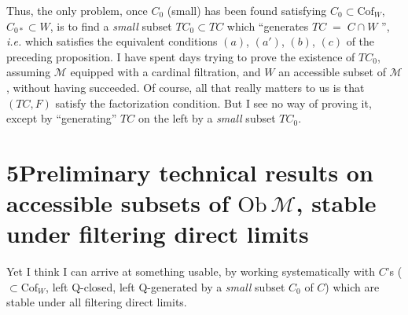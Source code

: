 \documentclass[11pt]{article}
\newcommand{\msp}[1]{\marginpar{\footnotesize [#1]}}
\newcommand{\Cof}{\mathrm{Cof}}
\begin{document}
\msp{page 43}
Thus, the only problem, once $C_0$ (small) has been found satisfying $C_0\subset\Cof_W$, $C_{0*}\subset W$, is to find a \textit{small} subset $TC_0\subset TC$ which ``generates $TC\;=\;C\cap W$ '', \textit{i.e.} which satisfies the equivalent conditions $(a)$, $(a')$, $(b)$, $(c)$ of the preceding proposition. I have spent days trying to prove the existence of $TC_0$, assuming $\mathcal{M}$ equipped with a cardinal filtration, and $W$ an accessible subset of $\mathcal{M}$, without having succeeded. Of course, all that really matters to us is that $(TC,F)$ satisfy the factorization condition. But I see no way of proving it, except by ``generating'' $TC$ on the left by a \textit{small} subset $TC_0$.

\section*{5\quad Preliminary technical results on accessible subsets of $\mathrm{Ob}\,\mathcal{M}$, stable under filtering direct limits}

Yet I think I can arrive at something usable, by working systematically with $C$'s ($\subset\Cof_W$, left Q-closed, left Q-generated by a \textit{small} subset $C_0$ of $C$) which are stable under all filtering direct limits.
\end{document}
